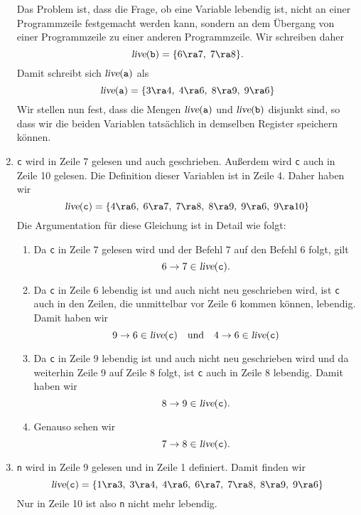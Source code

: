 \begin{enumerate}
      Das Problem ist, dass die Frage, ob eine Variable lebendig ist, nicht an einer
      Programmzeile festgemacht werden kann, sondern an dem \"Ubergang von einer
      Programmzeile zu einer anderen Programmzeile.  Wir schreiben daher
      \[ \textsl{live}(\mathtt{b}) = \{ 6 \ra 7,\; 7 \ra 8 \}. \]
      Damit schreibt sich $\textsl{live}(\mathtt{a})$ als
      \[ \textsl{live}(\mathtt{a}) = \{ 3 \ra 4,\; 4 \ra 6,\; 8 \ra 9,\; 9 \ra 6 \} \]
      Wir stellen nun fest, dass die Mengen $\textsl{live}(\mathtt{a})$ und
      $\textsl{live}(\mathtt{b})$ disjunkt sind, so dass wir die beiden Variablen
      tats\"achlich in demselben Register speichern k\"onnen.
\item \texttt{c} wird in Zeile 7 gelesen und auch geschrieben.  Au{\ss}erdem wird \texttt{c}
      auch in Zeile 10 gelesen.  Die Definition dieser Variablen ist in Zeile 4.  Daher
      haben wir
      \[ \textsl{live}(\mathtt{c})  = 
         \{ 4 \ra 6,\; 6 \ra 7,\; 7 \ra 8,\; 8 \ra 9,\; 9 \ra 6,\; 9 \ra 10 \}
      \]
      Die Argumentation f\"ur diese Gleichung ist in Detail wie folgt:
      \begin{enumerate}
      \item Da \texttt{c} in Zeile 7 gelesen wird und der Befehl 7 auf den Befehl 6 folgt, gilt
            \[ 6 \rightarrow 7 \in \textsl{live}(\mathtt{c}). \]
      \item Da \texttt{c} in Zeile 6 lebendig ist und auch nicht neu geschrieben wird,
            ist \texttt{c} auch in den Zeilen, die unmittelbar vor Zeile 6 kommen k\"onnen, lebendig.
            Damit haben wir
            \[ 9 \rightarrow 6 \in \textsl{live}(\mathtt{c}) \quad \mbox{und} \quad
               4 \rightarrow 6 \in \textsl{live}(\mathtt{c}) 
            \]
      \item Da \texttt{c} in Zeile 9 lebendig ist und auch nicht neu geschrieben wird
            und da weiterhin Zeile 9 auf Zeile 8 folgt, ist \texttt{c} auch in Zeile 8 lebendig.
            Damit haben wir
            \[ 8 \rightarrow 9 \in \textsl{live}(\mathtt{c}). \]
      \item Genauso sehen wir       
            \[ 7 \rightarrow 8 \in \textsl{live}(\mathtt{c}). \]
      \end{enumerate}
\item \texttt{n} wird in Zeile 9 gelesen und in Zeile 1 definiert.  Damit finden wir
      \[ \textsl{live}(\mathtt{c})  = 
         \{ 1 \ra 3,\; 3 \ra 4,\; 4 \ra 6,\; 6 \ra 7,\; 7 \ra 8,\; 8 \ra 9,\; 9 \ra 6 \}
      \]
      Nur in Zeile 10 ist also \texttt{n} nicht mehr lebendig.
\end{enumerate}
